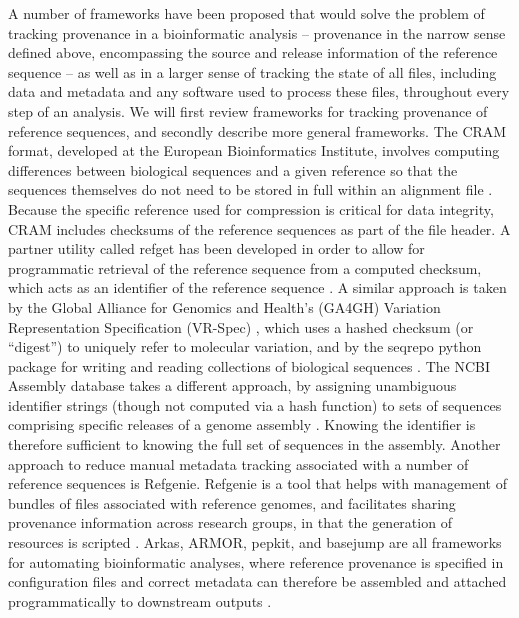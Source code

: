 \documentclass[12pt]{article} \usepackage[utf8]{inputenc}
\begin{document}
A number of frameworks have been proposed that would solve the problem
of tracking provenance in a bioinformatic analysis -- provenance in
the narrow sense defined above, encompassing the source and release
information of the reference sequence -- as well as in a larger sense
of tracking the state of all files, including data and metadata and
any software used to process these files, throughout every step of an
analysis. We will first review frameworks for tracking provenance of
reference sequences, and secondly describe more general
frameworks. The CRAM format, developed at the European Bioinformatics
Institute, involves computing differences between biological sequences
and a given reference so that the sequences themselves do not need to
be stored in full within an alignment file \citep{cram}. Because the
specific reference used for compression is critical for data
integrity, CRAM includes checksums of the reference sequences as part
of the file header. A partner utility called refget has been developed
in order to allow for programmatic retrieval of the reference sequence
from a computed checksum, which acts as an identifier of the reference
sequence \citep{refget}. A similar approach is taken by the Global
Alliance for Genomics and Health's (GA4GH) Variation Representation
Specification (VR-Spec) \citep{vr}, which uses a hashed checksum (or
``digest'') to uniquely refer to molecular variation, and by the
seqrepo python package for writing and reading collections of
biological sequences \citep{seqrepo}. The NCBI Assembly database takes
a different approach, by assigning unambiguous identifier strings
(though not computed via a hash function) to sets of sequences
comprising specific releases of a genome assembly
\citep{ncbi-assembly}. Knowing the identifier is therefore sufficient
to knowing the full set of sequences in the assembly.
Another approach to reduce manual metadata tracking associated with a
number of reference sequences is Refgenie. Refgenie is a tool that
helps with management of bundles of files associated with reference
genomes, and facilitates sharing provenance information across
research groups, in that the generation of resources is scripted
\citep{refgenie}. Arkas, ARMOR, pepkit, and basejump are all
frameworks for automating bioinformatic analyses, where reference
provenance is specified in configuration files and correct metadata
can therefore be assembled and attached programmatically to downstream
outputs \citep{arkas,Orjuelag2019,pepkit,basejump}.
\end{document}
